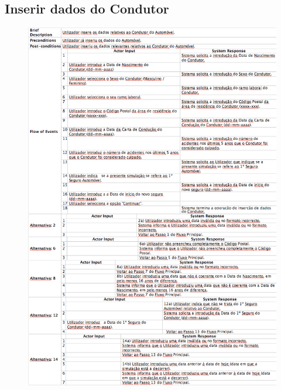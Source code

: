 \subsection{Inserir dados do Condutor}
\begin{figure}[!htb]
	\centering
	\includegraphics[scale=0.45]{images/Prints/RealizacaoSeguroAutomovel/InserirDadosDoCondutor.png}
\end{figure}

\pagebreak

